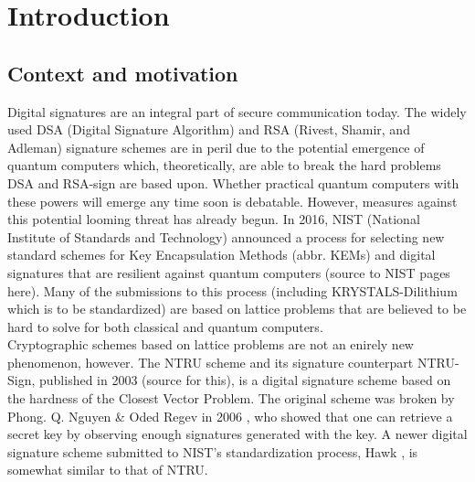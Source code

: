 \chapter{Introduction}
\section{Context and motivation}
Digital signatures are an integral part of secure communication today. The widely used DSA (Digital Signature Algorithm)
and RSA (Rivest, Shamir, and Adleman) signature schemes are in peril due to the potential emergence of quantum computers which, 
theoretically, are able to break the hard problems DSA and RSA-sign are based upon.
Whether practical quantum computers with these powers will emerge any time soon is debatable. However, measures against this potential looming threat has already begun. 
In 2016, NIST (National Institute of Standards and Technology) announced a process for selecting new standard schemes for Key Encapsulation Methods (abbr. KEMs) and 
digital signatures that are resilient against quantum computers (source to NIST pages here). Many of the submissions to this process (including KRYSTALS-Dilithium which is to be standardized) 
are based on lattice problems that are believed to be hard to solve for both classical and quantum computers. \hfill \break \\

Cryptographic schemes based on lattice problems are not an enirely new phenomenon, however. The NTRU scheme and its signature counterpart NTRU-Sign, published in 2003 (source for this),
is a digital signature scheme based on the hardness of the Closest Vector Problem.
The original scheme was broken by Phong. Q. Nguyen \& Oded Regev in 2006 \cite{NR09}, who showed that one can retrieve a secret key by observing enough signatures generated with the key.
A newer digital signature scheme submitted to NIST's standardization process, Hawk \cite{HawkSpec24}, is somewhat similar to that of NTRU. 

